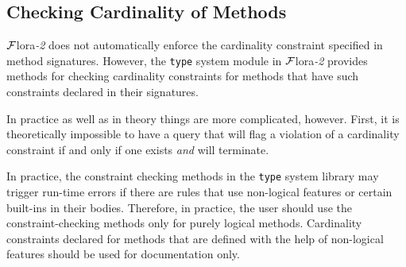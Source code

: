 \documentclass[11pt]{article}
\newcommand{\FLSYSTEM}{{\mbox{\sc ${\cal F}${lora}\rm\emph{-2}}}\xspace}
\begin{document}
\subsection{Checking Cardinality of Methods}\label{sec-cardinality}

\FLSYSTEM does not automatically enforce the cardinality constraint specified
in method signatures.  However, the {\tt type} system module in \FLSYSTEM
provides methods for checking cardinality
constraints for methods that have such constraints declared in their
signatures.

In practice as well as in theory things are more complicated, however.
First, it is theoretically impossible to have a query that will flag a
violation of a cardinality constraint if and only if one exists \emph{and}
will terminate.

In practice, the constraint checking methods
in the {\tt type} system library may trigger run-time
errors if there are rules that use non-logical features or certain
built-ins
in their bodies.  Therefore, in practice, the user should use the
constraint-checking methods only for purely logical methods. Cardinality
constraints declared for methods that are defined with the help of
non-logical features should be used for documentation only.
\end{document}
